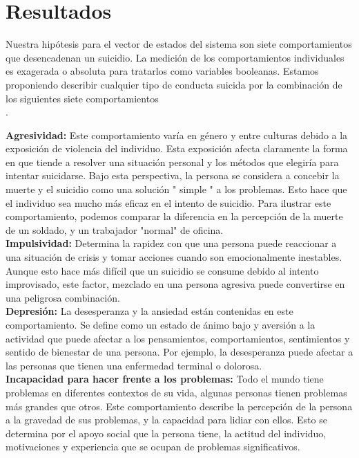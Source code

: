 {{{{\section{Resultados}
{
Nuestra hipótesis para el vector de estados del sistema son siete comportamientos que desencadenan un suicidio. La medición de los comportamientos individuales es exagerada o absoluta para tratarlos como variables booleanas. Estamos proponiendo describir cualquier tipo de conducta suicida por la combinación de los siguientes siete comportamientos \\.


\textbf{Agresividad:} Este comportamiento varía en género y entre culturas debido a la exposición de violencia del individuo. Esta exposición afecta claramente la forma en que tiende a resolver una situación personal y los métodos que elegiría para intentar suicidarse. Bajo esta perspectiva, la persona se considera a concebir la muerte y el suicidio como una solución " simple " a los problemas. Esto hace que el individuo sea mucho más eficaz en el intento de suicidio. Para ilustrar este comportamiento, podemos comparar la diferencia en la percepción de la muerte de un soldado, y un trabajador "normal" de oficina. \\

\textbf{Impulsividad:} Determina la rapidez con que una persona puede reaccionar a una situación de crisis y tomar acciones cuando son emocionalmente inestables. Aunque esto hace más difícil que un suicidio se consume debido al intento improvisado, este factor, mezclado en una persona agresiva puede convertirse en una peligrosa combinación. \\

\textbf{Depresión:} La desesperanza y la ansiedad están contenidas en este comportamiento. Se define como un estado de ánimo bajo y aversión a la actividad que puede afectar a los pensamientos, comportamientos, sentimientos y sentido de bienestar de una persona. Por ejemplo, la desesperanza puede afectar a las personas que tienen una enfermedad terminal o dolorosa. \\

\textbf{Incapacidad para hacer frente a los problemas:} Todo el mundo tiene problemas en diferentes contextos de su vida, algunas personas tienen problemas más grandes que otros. Este comportamiento describe la percepción de la persona a la gravedad de sus problemas, y la capacidad para lidiar con ellos. Esto se determina por el apoyo social que la persona tiene, la actitud del individuo, motivaciones y experiencia que se ocupan de problemas significativos.\\

}}}}}
